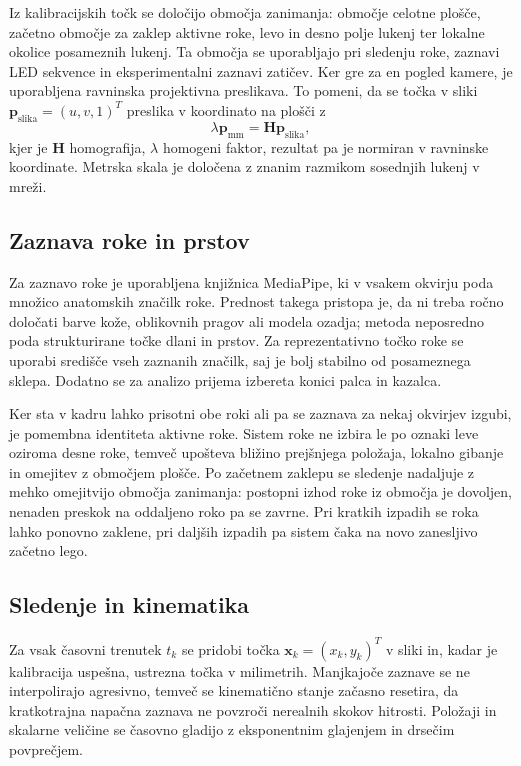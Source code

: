 \documentclass[journal,a4paper,twoside]{sty/IEEEtran}
\begin{document}
Iz kalibracijskih točk se določijo območja zanimanja: območje celotne plošče, začetno območje za zaklep aktivne roke, levo in desno polje lukenj ter lokalne okolice posameznih lukenj. Ta območja se uporabljajo pri sledenju roke, zaznavi LED sekvence in eksperimentalni zaznavi zatičev. Ker gre za en pogled kamere, je uporabljena ravninska projektivna preslikava. To pomeni, da se točka v sliki $\mathbf{p}_{\mathrm{slika}}=(u,v,1)^T$ preslika v koordinato na plošči z
\begin{equation}
    \lambda \mathbf{p}_{\mathrm{mm}} =
    \mathbf{H} \mathbf{p}_{\mathrm{slika}},
\end{equation}
kjer je $\mathbf{H}$ homografija, $\lambda$ homogeni faktor, rezultat pa je normiran v ravninske koordinate. Metrska skala je določena z znanim razmikom sosednjih lukenj v mreži.

\subsection{Zaznava roke in prstov}

Za zaznavo roke je uporabljena knjižnica MediaPipe, ki v vsakem okvirju poda množico anatomskih značilk roke. Prednost takega pristopa je, da ni treba ročno določati barve kože, oblikovnih pragov ali modela ozadja; metoda neposredno poda strukturirane točke dlani in prstov. Za reprezentativno točko roke se uporabi središče vseh zaznanih značilk, saj je bolj stabilno od posameznega sklepa. Dodatno se za analizo prijema izbereta konici palca in kazalca.

Ker sta v kadru lahko prisotni obe roki ali pa se zaznava za nekaj okvirjev izgubi, je pomembna identiteta aktivne roke. Sistem roke ne izbira le po oznaki leve oziroma desne roke, temveč upošteva bližino prejšnjega položaja, lokalno gibanje in omejitev z območjem plošče. Po začetnem zaklepu se sledenje nadaljuje z mehko omejitvijo območja zanimanja: postopni izhod roke iz območja je dovoljen, nenaden preskok na oddaljeno roko pa se zavrne. Pri kratkih izpadih se roka lahko ponovno zaklene, pri daljših izpadih pa sistem čaka na novo zanesljivo začetno lego.

\subsection{Sledenje in kinematika}

Za vsak časovni trenutek $t_k$ se pridobi točka $\mathbf{x}_k=(x_k,y_k)^T$ v sliki in, kadar je kalibracija uspešna, ustrezna točka v milimetrih. Manjkajoče zaznave se ne interpolirajo agresivno, temveč se kinematično stanje začasno resetira, da kratkotrajna napačna zaznava ne povzroči nerealnih skokov hitrosti. Položaji in skalarne veličine se časovno gladijo z eksponentnim glajenjem in drsečim povprečjem.
\end{document}
